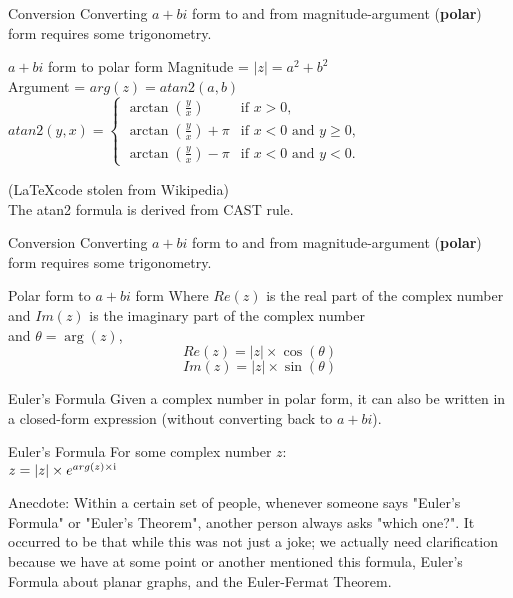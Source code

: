 \begin{namedframe}{Conversion}
	Converting $a + bi$ form to and from magnitude-argument (\textbf{polar}) form requires some trigonometry.
	\begin{block}{$a + bi$ form to polar form}
		Magnitude = $|z| = a^2 + b^2$ \\
		Argument = $arg(z) = atan2(a, b)$ \\
		$atan2(y,x)=\begin{cases}\arctan({\frac {y}{x}})&{\text{if }}x>0,\\\arctan({\frac {y}{x}})+\pi &{\text{if }}x<0{\text{ and }}y\geq 0,\\\arctan({\frac {y}{x}})-\pi &{\text{if }}x<0{\text{ and }}y<0.\end{cases}$ \\
		\footnotesize 
	\end{block}
	\footnotesize
	(\LaTeX code stolen from Wikipedia) \\
	\normalsize
	The atan2 formula is derived from CAST rule.
\end{namedframe}

\begin{namedframe}{Conversion}
	Converting $a + bi$ form to and from magnitude-argument (\textbf{polar}) form requires some trigonometry.
	\begin{block}{Polar form to $a + bi$ form}
		Where $Re(z)$ is the real part of the complex number and $Im(z)$ is the imaginary part of the complex number \\
		and $\theta = \arg(z)$,
		\[Re(z) = |z| \times \cos(\theta)\]
		\[Im(z) = |z| \times \sin(\theta)\]
	\end{block}
\end{namedframe}

\begin{namedframe}{Euler's Formula}
	Given a complex number in polar form, it can also be written in a closed-form expression (without converting back to $a + bi$).
	\begin{block}{Euler's Formula}
		For some complex number $z$: \\
		$z = |z| \times e^{arg(z) \times \mathrm{i}}$
	\end{block}

	\tiny
	Anecdote: Within a certain set of people, whenever someone says "Euler's Formula" or "Euler's Theorem",
	another person always asks "which one?". It occurred to be that while this was not just a joke; we actually
	need clarification because we have at some point or another mentioned this formula, Euler's Formula about
	planar graphs, and the Euler-Fermat Theorem.
\end{namedframe}

